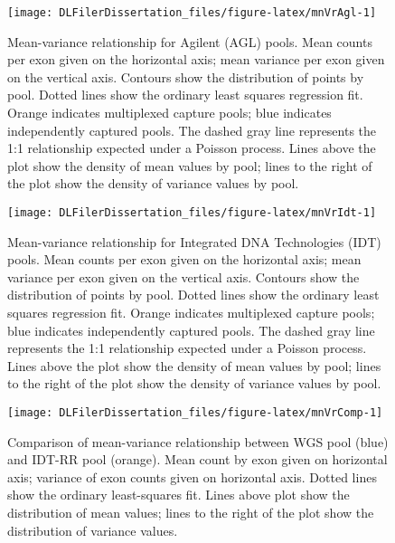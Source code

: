 \documentclass[11pt,letterpaper,oneside]{book}
\begin{document}
\begin{figure}

{\centering \texttt{[image: DLFilerDissertation\_files/figure-latex/mnVrAgl-1]} 

}

\caption[Mean-variance relationship for Agilent (AGL) pools.]{Mean-variance relationship for Agilent (AGL) pools. Mean counts per exon given on the horizontal axis; mean variance per exon given on the vertical axis. Contours show the distribution of points by pool. Dotted lines show the ordinary least squares regression fit. Orange indicates multiplexed capture pools; blue indicates independently captured pools. The dashed gray line represents the 1:1 relationship expected under a Poisson process. Lines above the plot show the density of mean values by pool; lines to the right of the plot show the density of variance values by pool.}\label{fig:mnVrAgl}
\end{figure}



\begin{figure}

{\centering \texttt{[image: DLFilerDissertation\_files/figure-latex/mnVrIdt-1]} 

}

\caption[Mean-variance relationship for Integrated DNA Technologies (IDT) pools.]{Mean-variance relationship for Integrated DNA Technologies (IDT) pools. Mean counts per exon given on the horizontal axis; mean variance per exon given on the vertical axis. Contours show the distribution of points by pool. Dotted lines show the ordinary least squares regression fit. Orange indicates multiplexed capture pools; blue indicates independently captured pools. The dashed gray line represents the 1:1 relationship expected under a Poisson process. Lines above the plot show the density of mean values by pool; lines to the right of the plot show the density of variance values by pool.}\label{fig:mnVrIdt}
\end{figure}





\begin{figure}

{\centering \texttt{[image: DLFilerDissertation\_files/figure-latex/mnVrComp-1]} 

}

\caption[Comparison of mean-variance relationship between WGS pool and IDT-RR pool.]{Comparison of mean-variance relationship between WGS pool (blue) and IDT-RR pool (orange). Mean count by exon given on horizontal axis; variance of exon counts given on horizontal axis. Dotted lines show the ordinary least-squares fit. Lines above plot show the distribution of mean values; lines to the right of the plot show the distribution of variance values.}\label{fig:mnVrComp}
\end{figure}
\end{document}
